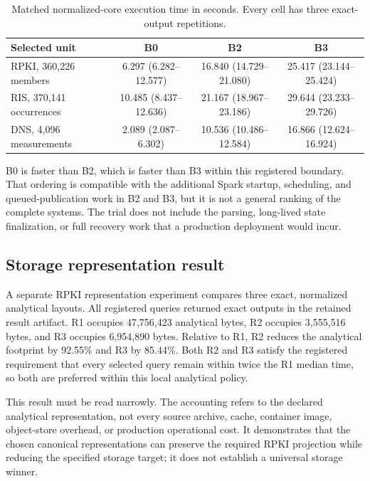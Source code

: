 \documentclass[a4paper,11pt]{article}
\begin{document}
\begin{table}[t]
\centering
\caption{Matched normalized-core execution time in seconds. Every cell has three exact-output repetitions.}
\label{tab:timing}
\small
\begin{tabular}{lccc}
\toprule
Selected unit & B0 & B2 & B3 \\
\midrule
RPKI, 360,226 members & 6.297 (6.282--12.577) & 16.840 (14.729--21.080) & 25.417 (23.144--25.424) \\
RIS, 370,141 occurrences & 10.485 (8.437--12.636) & 21.167 (18.967--23.186) & 29.644 (23.233--29.726) \\
DNS, 4,096 measurements & 2.089 (2.087--6.302) & 10.536 (10.486--12.584) & 16.866 (12.624--16.924) \\
\bottomrule
\end{tabular}
\end{table}

B0 is faster than B2, which is faster than B3 within this registered boundary. That ordering is compatible with the additional Spark startup, scheduling, and queued-publication work in B2 and B3, but it is not a general ranking of the complete systems. The trial does not include the parsing, long-lived state finalization, or full recovery work that a production deployment would incur.

\subsection{Storage representation result}
A separate RPKI representation experiment compares three exact, normalized analytical layouts. All registered queries returned exact outputs in the retained result artifact. R1 occupies 47,756,423 analytical bytes, R2 occupies 3,555,516 bytes, and R3 occupies 6,954,890 bytes. Relative to R1, R2 reduces the analytical footprint by 92.55\% and R3 by 85.44\%. Both R2 and R3 satisfy the registered requirement that every selected query remain within twice the R1 median time, so both are preferred within this local analytical policy.

This result must be read narrowly. The accounting refers to the declared analytical representation, not every source archive, cache, container image, object-store overhead, or production operational cost. It demonstrates that the chosen canonical representations can preserve the required RPKI projection while reducing the specified storage target; it does not establish a universal storage winner.
\end{document}
